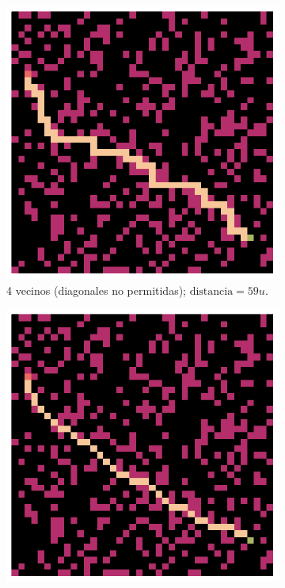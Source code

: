 \begin{enumerate}
\begin{solution}
        \begin{figure}[ht!]
            \centering
            \begin{subfigure}{0.4\textwidth}
                \centering
                \includegraphics[scale=0.3]{../figures/path_01.png}
                \caption{4 vecinos (diagonales no permitidas); $\text{distancia} = 59 u$.}
                \label{fig:nodiags_obs_25percent_40x40}
            \end{subfigure}
            \hspace{1cm}
            \begin{subfigure}{0.4\textwidth}
                \centering
                \includegraphics[scale=0.3]{../figures/path_01_diag.png}

\end{subfigure}
\end{figure}
\end{solution}
\end{enumerate}
